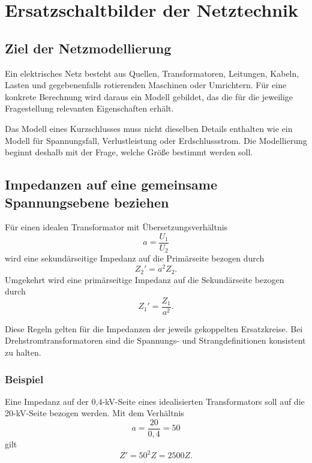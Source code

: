 \chapter{Ersatzschaltbilder der Netztechnik}
\label{chap:06-ersatzschaltbilder}


\section{Ziel der Netzmodellierung}

Ein elektrisches Netz besteht aus Quellen, Transformatoren, Leitungen,
Kabeln, Lasten und gegebenenfalls rotierenden Maschinen oder Umrichtern.
Für eine konkrete Berechnung wird daraus ein Modell gebildet, das die für
die jeweilige Fragestellung relevanten Eigenschaften erhält.

Das Modell eines Kurzschlusses muss nicht dieselben Details enthalten wie
ein Modell für Spannungsfall, Verlustleistung oder Erdschlussstrom. Die
Modellierung beginnt deshalb mit der Frage, welche Größe bestimmt werden soll.

\section{Impedanzen auf eine gemeinsame Spannungsebene beziehen}

Für einen idealen Transformator mit Übersetzungsverhältnis
\[
  a=\frac{U_1}{U_2}
\]
wird eine sekundärseitige Impedanz auf die Primärseite bezogen durch
\[
  Z_2'=a^2Z_2.
\]
Umgekehrt wird eine primärseitige Impedanz auf die Sekundärseite bezogen durch
\[
  Z_1'=\frac{Z_1}{a^2}.
\]

Diese Regeln gelten für die Impedanzen der jeweils gekoppelten Ersatzkreise.
Bei Drehstromtransformatoren sind die Spannungs- und Strangdefinitionen
konsistent zu halten.

\subsection{Beispiel}

Eine Impedanz auf der 0{,}4-kV-Seite eines idealisierten Transformators
soll auf die 20-kV-Seite bezogen werden. Mit dem Verhältnis
\[
  a=\frac{20}{0{,}4}=50
\]
gilt
\[
  Z'=50^2 Z=2500Z.
\]

